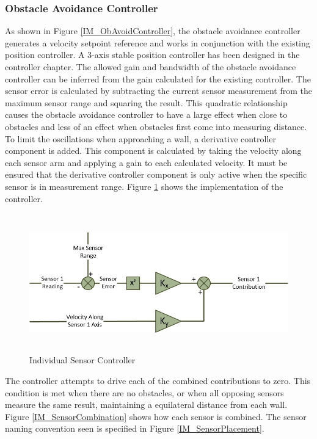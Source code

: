 			\subsubsection{Obstacle Avoidance Controller}
			As shown in Figure \ref{IM_ObAvoidController}, the obstacle avoidance controller generates a velocity setpoint reference and works in conjunction with the existing position controller. A 3-axis stable position controller has been designed in the controller chapter. The allowed gain and bandwidth of the obstacle avoidance controller can be inferred from the gain calculated for the existing controller. The sensor error is calculated by subtracting the current sensor measurement from the maximum sensor range and squaring the result. This quadratic relationship causes the obstacle avoidance controller to have a large effect when close to obstacles and less of an effect when obstacles first come into measuring distance. 
			To limit the oscillations when approaching a wall, a derivative controller component is added. This component is calculated by taking the velocity along each sensor arm and applying a gain to each calculated velocity. It must be ensured that the derivative controller component is only active when the specific sensor is in measurement range. Figure \ref{IM_SensorController} shows the implementation of the controller.
			
			\begin{figure}[H]
				\centering
				\includegraphics[height = 6cm]{../References/Diagrams/SensorController.jpg}     
				\caption{Individual Sensor Controller}
				\label{IM_SensorController}
			\end{figure}
			
			The controller attempts to drive each of the combined contributions to zero. This condition is met when there are no obstacles, or when all opposing sensors measure the same result, maintaining a equilateral distance from each wall. Figure \ref{IM_SensorCombination} shows how each sensor is combined. The sensor naming convention seen is specified in Figure \ref{IM_SensorPlacement}.
			
